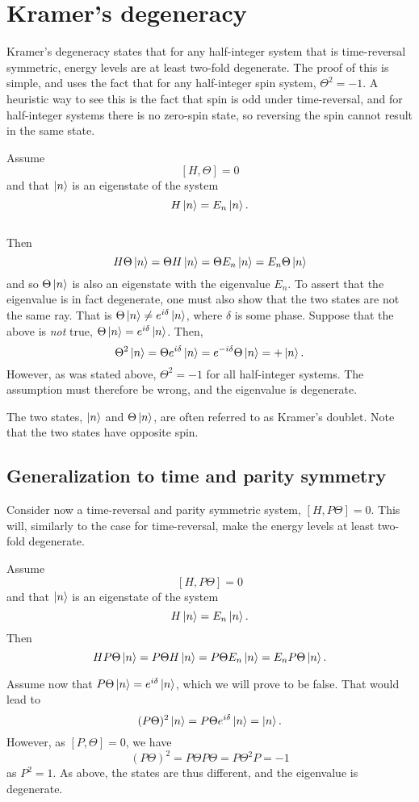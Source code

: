 \section{Kramer's degeneracy}


Kramer's degeneracy states that for any half-integer system that is time-reversal symmetric, energy levels are at least two-fold degenerate.
The proof of this is simple, and uses the fact that for any half-integer spin system, $\Theta^2 = -1$.
A heuristic way to see this is the fact that spin is odd under time-reversal, and for half-integer systems there is no zero-spin state, so reversing the spin cannot result in the same state.
\begin{Proof}
  Assume
  $$ [H, \Theta] = 0 $$
  and that $\ket{n}$ is an eigenstate of the system
  $$ H \ket{n} = E_n \ket{n}.$$\\
  Then
  $$
  H \Theta \ket{n} = \Theta H \ket{n} = \Theta E_n \ket{n} = E_n \Theta \ket{n}
  $$
  and so $\Theta \ket{n}$ is also an eigenstate with the eigenvalue $E_n$.
  To assert that the eigenvalue is in fact degenerate, one must also show that the two states are not the same ray.
  That is $\Theta \ket{n} \neq e^{i \delta} \ket{n}$, where $\delta$ is some phase.
  Suppose that the above is \emph{not} true, $\Theta \ket{n} = e^{i \delta} \ket{n}$.
  Then,
  $$
  \Theta^2 \ket{n} = \Theta e^{i\delta} \ket{n} = e^{-i\delta} \Theta \ket{n} = + \ket{n}.
  $$
  However, as was stated above, $\Theta^2 = -1$ for all half-integer systems.
  The assumption must therefore be wrong, and the eigenvalue is degenerate.
\end{Proof}
The two states, $\ket{n}$ and $\Theta \ket{n}$, are often referred to as Kramer's doublet.
Note that the two states have opposite spin.

\subsection{Generalization to time and parity symmetry}
Consider now a time-reversal and parity symmetric system, $[H, P \Theta] = 0$.
This will, similarly to the case for time-reversal, make the energy levels at least two-fold degenerate.
\begin{Proof}
  Assume
  $$
  [H,P \Theta] = 0
  $$
  and that $\ket{n}$ is an eigenstate of the system
  $$
  H\ket{n} = E_n\ket{n}.
  $$
  Then
  $$
  H P \Theta\ket{n} =
  P\Theta H \ket{n} =
  P \Theta E_n \ket{n} =
  E_n P\Theta \ket{n}.
  $$

  Assume now that $P\Theta \ket{n} = e^{i\delta} \ket{n}$, which we will prove to be false.
  That would lead to
  $$
  (P\Theta)^2 \ket{n} = P\Theta e^{i\delta} \ket{n}
  = \ket{n}.
  $$
  However, as $[P, \Theta] = 0$, we have
  $$
  (P\Theta)^2 =
  P\Theta P \Theta=
  P\Theta^2 P=
  -1
  $$
  as $P^2 = 1$.
  As above, the states are thus different, and the eigenvalue is degenerate.
\end{Proof}
